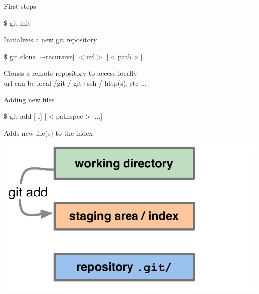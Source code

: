 \documentclass[10pt,xcolor=dvipsnames]{beamer}
\begin{document}
\begin{frame}{First steps}
\begin{block}{}
\$ git init
\end{block}
Initializes a new git repository\\[0.4in]

\begin{block}{}
\$ git clone [–-recursive] $<$url$>$ [$<$path$>$]
\end{block}
Clones a remote repository to access locally\\
url can be local /git / git+ssh / http(s), etc ...
\end{frame}

\begin{frame}{Adding new files}
\begin{block}{}
\$ git add [-f] [$<$pathspec$>$ ...]
\end{block}
Adds new file(s) to the index
\begin{center}
\includegraphics[scale=0.3]{diagrams_add_commit-02.pdf}
\end{center}
\end{frame}
\end{document}
